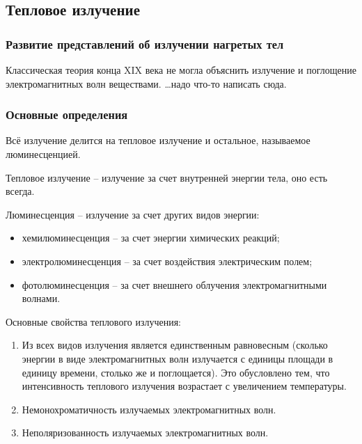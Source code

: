 \subsection{Тепловое излучение}
\subsubsection{Развитие представлений об излучении нагретых тел}
    Классическая теория конца XIX века не могла объяснить излучение и поглощение электромагнитных волн веществами. \ldots надо что-то написать сюда.
\subsubsection{Основные определения}
    Всё излучение делится на тепловое излучение и остальное, называемое люминесценцией.
    
    Тепловое излучение -- излучение за счет внутренней энергии тела, оно есть всегда.
    
    Люминесценция -- излучение за счет других видов энергии:
    \begin{itemize}
        \item хемилюминесценция -- за счет энергии химических реакций;
        \item электролюминесценция -- за счет воздействия электрическим полем;
        \item фотолюминесценция -- за счет внешнего облучения электромагнитными волнами.
    \end{itemize}
    
    Основные свойства теплового излучения:
    \begin{enumerate}
        \item Из всех видов излучения является единственным равновесным (сколько энергии в виде электромагнитных волн излучается с единицы площади в единицу времени, столько же и поглощается). Это обусловлено тем, что интенсивность теплового излучения возрастает с увеличением температуры.
        \item Немонохроматичность излучаемых электромагнитных волн.
        \item Неполяризованность излучаемых электромагнитных волн.
    \end{enumerate}
    
